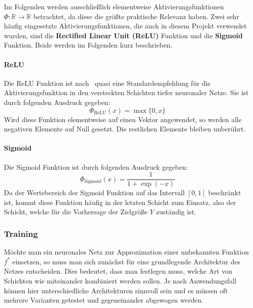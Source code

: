 Im Folgenden werden ausschlie{\ss}lich elementweise Aktivierungsfunktionen
$\Phi: \mathbb{R} \rightarrow \mathbb{R}$ betrachtet,
da diese die gr\"o{\ss}te praktische Relevanz haben.
Zwei sehr h\"aufig eingesetzte Aktivierungsfunktionen, die auch in diesem
Projekt verwendet wurden, sind die \textbf{Rectified Linear Unit (ReLU)}
Funktion und die \textbf{Sigmoid} Funktion.
Beide werden im Folgenden kurz beschrieben.

\paragraph{ReLU}

Die ReLU Funktion ist nach~\cite{glorot} quasi eine
Standardempfehlung f\"ur die Aktivierungsfunktion in den
versteckten Schichten tiefer neuronaler Netze.
Sie ist durch folgenden Ausdruck gegeben:
\begin{equation*}
    \Phi_\text{ReLU}(x) = \max \{ 0, x \}
\end{equation*}
Wird diese Funktion elementweise auf einen Vektor angewendet, so werden
alle negativen Elemente auf Null gesetzt. Die restlichen Elemente bleiben
unber\"uhrt.

\paragraph{Sigmoid} Die Sigmoid Funktion ist durch folgenden Ausdruck gegeben:
\begin{equation*}
    \Phi_\text{Sigmoid}(x) = \frac{1}{1 + \exp{(-x)}}
\end{equation*}
Da der Wertebereich der Sigmoid Funktion auf das Intervall $[0, 1]$
beschr\"ankt ist, kommt diese Funktion h\"aufig in der letzten Schicht
zum Einsatz, also der Schicht, welche f\"ur die Vorhersage der
Zielgr\"o{\ss}e $Y$ zust\"andig ist.

\subsubsection{Training}
\label{sec:training}

M\"ochte man ein neuronales Netz zur Approximation einer unbekannten
Funktion $f^*$ einsetzen, so muss man sich zun\"achst f\"ur eine
grundlegende Architektur des Netzes entscheiden.
Dies bedeutet, dass man festlegen muss, welche Art von Schichten wie
miteinander kombiniert werden sollen.
Je nach Anwendungsfall k\"onnen hier unterschiedliche Architekturen
sinnvoll sein und es m\"ussen oft mehrere Varianten getestet und
gegeneinander abgewogen werden.

